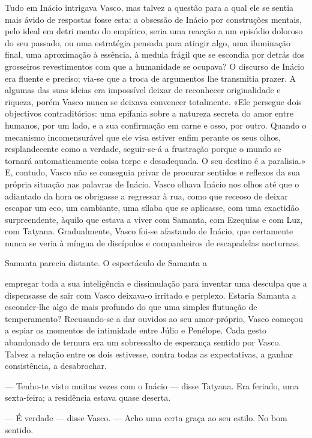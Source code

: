 Tudo em Inácio intrigava Vasco, mas talvez a questão para a qual ele se
sentia mais ávido de respostas fosse esta: a obsessão de Inácio por
construções mentais, pelo ideal em detri
mento do empírico, seria uma reacção a um episódio doloroso do seu
passado, ou uma estratégia pensada para atingir algo, uma iluminação
final, uma aproximação à essência, à medula frágil que se escondia por
detrás dos grosseiros revestimentos com que a humanidade se ocupava? O
discurso de Inácio era fluente e preciso; via-se que a troca de
argumentos lhe transmitia prazer. A algumas das suas ideias era
impossível deixar de reconhecer originalidade e riqueza, porém Vasco
nunca se deixava convencer totalmente. «Ele persegue dois objectivos
contraditórios: uma epifania sobre a natureza secreta do amor entre
humanos, por um lado, e a sua confirmação em carne e osso, por outro.
Quando o mecanismo incomensurável que ele visa estiver enfim perante os
seus olhos, resplandecente como a verdade, seguir-se-á a frustração
porque o mundo se tornará automaticamente coisa torpe e desadequada. O
seu destino é a paralisia.» E, contudo, Vasco não se conseguia privar de
procurar sentidos e reflexos da sua própria situação nas palavras de
Inácio. Vasco olhava Inácio nos olhos até que o adiantado da hora os
obrigasse a regressar à rua, como que receoso de deixar escapar um eco,
um cambiante, uma sílaba que se aplicasse, com uma exactidão
surpreendente, àquilo que estava a viver com Samanta, com Ezequias e com
Luz, com Tatyana. Gradualmente, Vasco foi-se afastando de Inácio, que
certamente nunca se veria à míngua de discípulos e companheiros de
escapadelas nocturnas.

Samanta parecia distante. O espectáculo de Samanta a

empregar toda a sua inteligência e dissimulação para inventar uma
desculpa que a dispensasse de sair com Vasco deixava-o irritado e
perplexo. Estaria Samanta a esconder-lhe algo de mais profundo do que
uma simples flutuação de temperamento? Recusando-se a dar ouvidos ao
seu amor-próprio, Vasco começou a espiar os momentos de intimidade entre Júlio e Penélope. Cada
gesto abandonado de ternura era um sobressalto de esperança sentido
por Vasco. Talvez a relação entre os dois estivesse, contra todas as
expectativas, a ganhar consistência, a desabrochar.

--- Tenho-te visto muitas vezes com o Inácio --- disse Tatyana. Era
  feriado, uma sexta-feira; a residência estava quase deserta.

--- É verdade --- disse Vasco. --- Acho uma certa graça ao seu estilo. No
  bom sentido.

